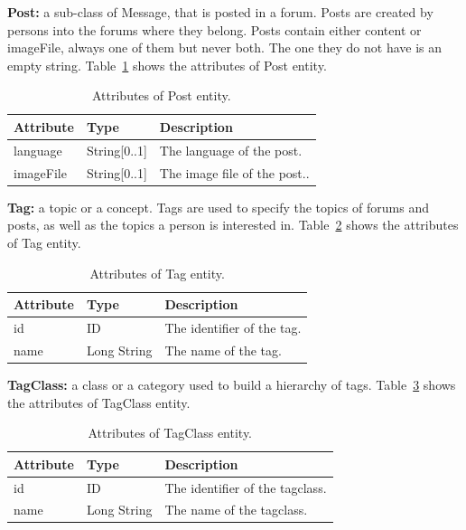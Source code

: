 {\flushleft \textbf{Post:}} a sub-class of Message, that is posted in a
forum. Posts are created by persons into the forums where they belong.
Posts contain either content or imageFile, always one of them but never both.
The one they do not have is an empty string.
Table~\ref{table:post} shows the attributes of Post entity.

\begin{table}[H]
    \begin{tabular}{|p{\attributecolumn}|p{\typecolumn}|p{\descriptioncolumn}|}
        \hline
        \textbf{Attribute} & \textbf{Type} & \textbf{Description} \\
        \hline
        language & String[0..1]  & The language of the post.\\
        \hline
        imageFile & String[0..1]  & The image file of the post..\\
        \hline
    \end{tabular}
    \caption{Attributes of Post entity.}
    \label{table:post}
\end{table}

{\flushleft \textbf{Tag:}} a topic or a concept. Tags are used to
specify the topics of forums and posts, as well as the topics a person is
interested in. Table~\ref{table:tag} shows the attributes of Tag entity.

\begin{table}[H]
    \begin{tabular}{|p{\attributecolumn}|p{\typecolumn}|p{\descriptioncolumn}|}
        \hline
        \textbf{Attribute} & \textbf{Type} & \textbf{Description} \\
        \hline
        id & ID  & The identifier of the tag.\\
        \hline
        name & Long String  &  The name of the tag.\\
        \hline
    \end{tabular}
    \caption{Attributes of Tag entity.}
    \label{table:tag}
\end{table}

{\flushleft \textbf{TagClass:}} a class or a category used to build
a hierarchy of tags. Table~\ref{table:tagclass} shows the attributes of TagClass
entity.

\begin{table}[H]
    \begin{tabular}{|p{\attributecolumn}|p{\typecolumn}|p{\descriptioncolumn}|}
        \hline
        \textbf{Attribute} & \textbf{Type} & \textbf{Description} \\
        \hline
        id & ID  & The identifier of the tagclass.\\
        \hline
        name & Long String  &  The name of the tagclass.\\
        \hline
    \end{tabular}
    \caption{Attributes of TagClass entity.}
    \label{table:tagclass}
\end{table}

